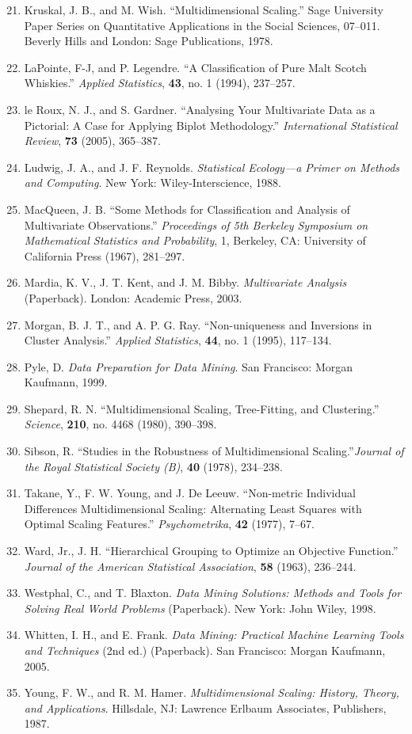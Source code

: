 
\begin{enumerate}
\setcounter{enumi}{20}
\item Kruskal, J. B., and M. Wish. “Multidimensional Scaling.” Sage University Paper Series on Quantitative Applications in the Social Sciences, 07--011. Beverly Hills and London: Sage Publications, 1978.
\item LaPointe, F-J, and P. Legendre. “A Classification of Pure Malt Scotch Whiskies.” \textit{Applied Statistics}, \textbf{43}, no. 1 (1994), 237--257.
\item le Roux, N. J., and S. Gardner. “Analysing Your Multivariate Data as a Pictorial: A Case for Applying Biplot Methodology.” \textit{International Statistical Review}, \textbf{73} (2005), 365--387.
\item Ludwig, J. A., and J. F. Reynolds. \textit{Statistical Ecology---a Primer on Methods and Computing}. New York: Wiley-Interscience, 1988.
\item MacQueen, J. B. “Some Methods for Classification and Analysis of Multivariate Observations.” \textit{Proceedings of 5th Berkeley Symposium on Mathematical Statistics and Probability}, 1, Berkeley, CA: University of California Press (1967), 281--297.
\item Mardia, K. V., J. T. Kent, and J. M. Bibby. \textit{Multivariate Analysis} (Paperback). London: Academic Press, 2003.
\item Morgan, B. J. T., and A. P. G. Ray. “Non-uniqueness and Inversions in Cluster Analysis.” \textit{Applied Statistics}, \textbf{44}, no. 1 (1995), 117--134.
\item Pyle, D. \textit{Data Preparation for Data Mining}. San Francisco: Morgan Kaufmann, 1999.
\item Shepard, R. N. “Multidimensional Scaling, Tree-Fitting, and Clustering.” \textit{Science}, \textbf{210}, no. 4468 (1980), 390--398.
\item Sibson, R. “Studies in the Robustness of Multidimensional Scaling.”\textit{Journal of the Royal Statistical Society (B)}, \textbf{40} (1978), 234--238.
\item Takane, Y., F. W. Young, and J. De Leeuw. “Non-metric Individual Differences Multidimensional Scaling: Alternating Least Squares with Optimal Scaling Features.” \textit{Psychometrika}, \textbf{42} (1977), 7--67.
\item Ward, Jr., J. H. “Hierarchical Grouping to Optimize an Objective Function.” \textit{Journal of the American Statistical Association}, \textbf{58} (1963), 236--244.
\item Westphal, C., and T. Blaxton. \textit{Data Mining Solutions: Methods and Tools for Solving Real World Problems} (Paperback). New York: John Wiley, 1998.
\item Whitten, I. H., and E. Frank. \textit{Data Mining: Practical Machine Learning Tools and Techniques} (2nd ed.) (Paperback). San Francisco: Morgan Kaufmann, 2005.
\item Young, F. W., and R. M. Hamer. \textit{Multidimensional Scaling: History, Theory, and Applications}. Hillsdale, NJ: Lawrence Erlbaum Associates, Publishers, 1987.
\end{enumerate}

